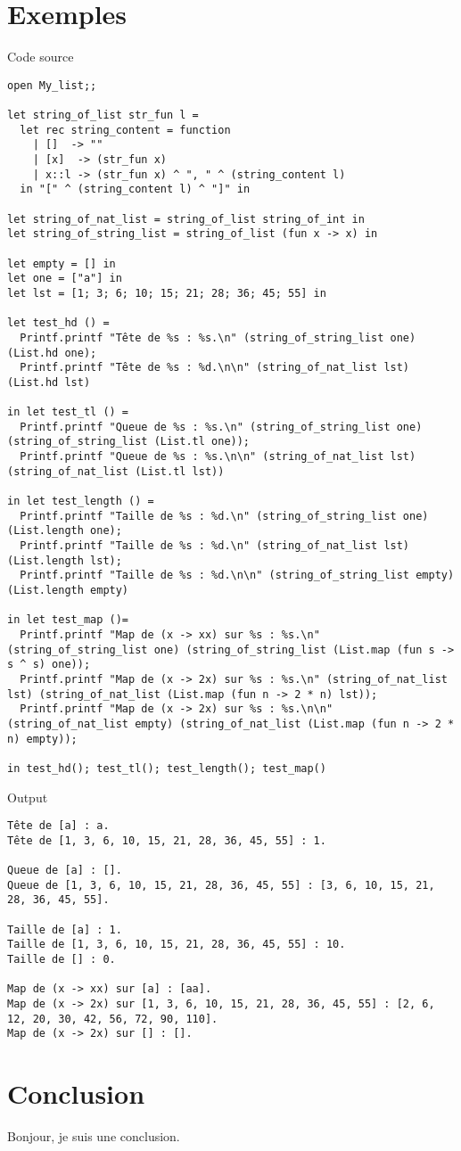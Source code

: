 \documentclass[12pt,a4paper]{article}
\newenvironment{longlisting}{\captionsetup{type=listing, width=\linewidth}}{}
\begin{document}
\section{Exemples}
	\begin{longlisting}
	\caption{Code source}
	\begin{verbatim}
open My_list;;

let string_of_list str_fun l =
  let rec string_content = function
    | []  -> ""
    | [x]  -> (str_fun x)
    | x::l -> (str_fun x) ^ ", " ^ (string_content l)
  in "[" ^ (string_content l) ^ "]" in

let string_of_nat_list = string_of_list string_of_int in
let string_of_string_list = string_of_list (fun x -> x) in

let empty = [] in
let one = ["a"] in
let lst = [1; 3; 6; 10; 15; 21; 28; 36; 45; 55] in

let test_hd () =
  Printf.printf "Tête de %s : %s.\n" (string_of_string_list one) (List.hd one);
  Printf.printf "Tête de %s : %d.\n\n" (string_of_nat_list lst) (List.hd lst)

in let test_tl () =
  Printf.printf "Queue de %s : %s.\n" (string_of_string_list one) (string_of_string_list (List.tl one));
  Printf.printf "Queue de %s : %s.\n\n" (string_of_nat_list lst) (string_of_nat_list (List.tl lst))

in let test_length () =
  Printf.printf "Taille de %s : %d.\n" (string_of_string_list one) (List.length one);
  Printf.printf "Taille de %s : %d.\n" (string_of_nat_list lst) (List.length lst);
  Printf.printf "Taille de %s : %d.\n\n" (string_of_string_list empty) (List.length empty)

in let test_map ()=
  Printf.printf "Map de (x -> xx) sur %s : %s.\n" (string_of_string_list one) (string_of_string_list (List.map (fun s -> s ^ s) one));
  Printf.printf "Map de (x -> 2x) sur %s : %s.\n" (string_of_nat_list lst) (string_of_nat_list (List.map (fun n -> 2 * n) lst));
  Printf.printf "Map de (x -> 2x) sur %s : %s.\n\n" (string_of_nat_list empty) (string_of_nat_list (List.map (fun n -> 2 * n) empty));

in test_hd(); test_tl(); test_length(); test_map()
	\end{verbatim}
	\end{longlisting}
	
	\begin{longlisting}
	\caption{Output}
	\begin{verbatim}
Tête de [a] : a.
Tête de [1, 3, 6, 10, 15, 21, 28, 36, 45, 55] : 1.

Queue de [a] : [].
Queue de [1, 3, 6, 10, 15, 21, 28, 36, 45, 55] : [3, 6, 10, 15, 21, 28, 36, 45, 55].

Taille de [a] : 1.
Taille de [1, 3, 6, 10, 15, 21, 28, 36, 45, 55] : 10.
Taille de [] : 0.

Map de (x -> xx) sur [a] : [aa].
Map de (x -> 2x) sur [1, 3, 6, 10, 15, 21, 28, 36, 45, 55] : [2, 6, 12, 20, 30, 42, 56, 72, 90, 110].
Map de (x -> 2x) sur [] : [].
	\end{verbatim}
	\end{longlisting}
	\section{Conclusion}
	Bonjour, je suis une conclusion.
\end{document}
